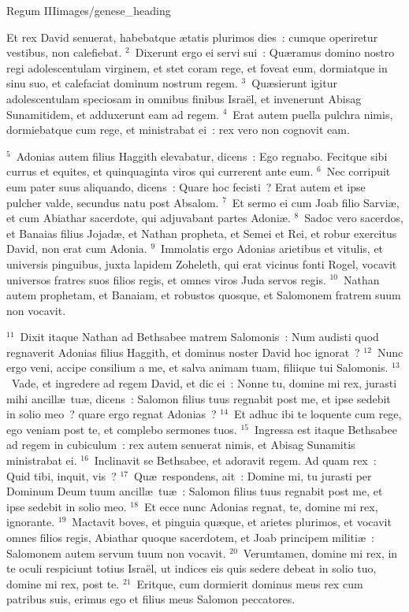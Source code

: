{Regum III}{images/genese_heading}


\bchapter
\lettrine[lines=6,image=true,loversize=0.05,lraise=-0.03]{E}{}t rex David senuerat, habebatque \ae tatis plurimos dies~: cumque operiretur vestibus, non calefiebat.
${}^{2}$~Dixerunt ergo ei servi sui~: Qu\ae ramus domino nostro regi adolescentulam virginem, et stet coram rege, et foveat eum, dormiatque in sinu suo, et calefaciat dominum nostrum regem.
${}^{3}$~Qu\ae sierunt igitur adolescentulam speciosam in omnibus finibus Isra\"el, et invenerunt Abisag Sunamitidem, et adduxerunt eam ad regem.
${}^{4}$~Erat autem puella pulchra nimis, dormiebatque cum rege, et ministrabat ei~: rex vero non cognovit eam.


${}^{5}$~Adonias autem filius Haggith elevabatur, dicens~: Ego regnabo. Fecitque sibi currus et equites, et quinquaginta viros qui currerent ante eum.
${}^{6}$~Nec corripuit eum pater suus aliquando, dicens~: Quare hoc fecisti~? Erat autem et ipse pulcher valde, secundus natu post Absalom.
${}^{7}$~Et sermo ei cum Joab filio Sarvi\ae , et cum Abiathar sacerdote, qui adjuvabant partes Adoni\ae .
${}^{8}$~Sadoc vero sacerdos, et Banaias filius Jojad\ae , et Nathan propheta, et Semei et Rei, et robur exercitus David, non erat cum Adonia.
${}^{9}$~Immolatis ergo Adonias arietibus et vitulis, et universis pinguibus, juxta lapidem Zoheleth, qui erat vicinus fonti Rogel, vocavit universos fratres suos filios regis, et omnes viros Juda servos regis.
${}^{10}$~Nathan autem prophetam, et Banaiam, et robustos quosque, et Salomonem fratrem suum non vocavit.


${}^{11}$~Dixit itaque Nathan ad Bethsabee matrem Salomonis~: Num audisti quod regnaverit Adonias filius Haggith, et dominus noster David hoc ignorat~?
${}^{12}$~Nunc ergo veni, accipe consilium a me, et salva animam tuam, filiique tui Salomonis.
${}^{13}$~Vade, et ingredere ad regem David, et dic ei~: Nonne tu, domine mi rex, jurasti mihi ancill\ae\ tu\ae , dicens~: Salomon filius tuus regnabit post me, et ipse sedebit in solio meo~? quare ergo regnat Adonias~?
${}^{14}$~Et adhuc ibi te loquente cum rege, ego veniam post te, et complebo sermones tuos.
${}^{15}$~Ingressa est itaque Bethsabee ad regem in cubiculum~: rex autem senuerat nimis, et Abisag Sunamitis ministrabat ei.
${}^{16}$~Inclinavit se Bethsabee, et adoravit regem. Ad quam rex~: Quid tibi, inquit, vis~?
${}^{17}$~Qu\ae\ respondens, ait~: Domine mi, tu jurasti per Dominum Deum tuum ancill\ae\ tu\ae~: Salomon filius tuus regnabit post me, et ipse sedebit in solio meo.
${}^{18}$~Et ecce nunc Adonias regnat, te, domine mi rex, ignorante.
${}^{19}$~Mactavit boves, et pinguia qu\ae que, et arietes plurimos, et vocavit omnes filios regis, Abiathar quoque sacerdotem, et Joab principem militi\ae~: Salomonem autem servum tuum non vocavit.
${}^{20}$~Verumtamen, domine mi rex, in te oculi respiciunt totius Isra\"el, ut indices eis quis sedere debeat in solio tuo, domine mi rex, post te.
${}^{21}$~Eritque, cum dormierit dominus meus rex cum patribus suis, erimus ego et filius meus Salomon peccatores.



